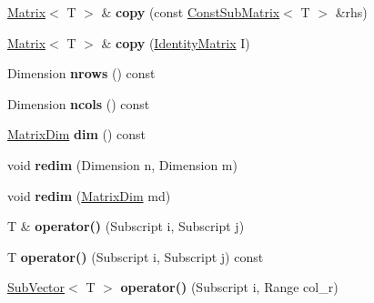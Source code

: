 \begin{DoxyCompactItemize}
\item 
\mbox{\label{classTLAS_1_1Matrix_a58a23834e4f79cbc28a7bef42d16a106}} 
\hyperlink{classTLAS_1_1Matrix}{Matrix}$<$ T $>$ \& {\bfseries copy} (const \hyperlink{classTLAS_1_1ConstSubMatrix}{Const\+Sub\+Matrix}$<$ T $>$ \&rhs)
\item 
\mbox{\label{classTLAS_1_1Matrix_ae0fe442180beb4d2e3a2495e793417c7}} 
\hyperlink{classTLAS_1_1Matrix}{Matrix}$<$ T $>$ \& {\bfseries copy} (\hyperlink{structTLAS_1_1IdentityMatrix}{Identity\+Matrix} I)
\item 
\mbox{\label{classTLAS_1_1Matrix_a99ee860378e9c58d20bda1dd3544e0d0}} 
Dimension {\bfseries nrows} () const
\item 
\mbox{\label{classTLAS_1_1Matrix_ae667fd3dc0fa26a0e3b26859a013523b}} 
Dimension {\bfseries ncols} () const
\item 
\mbox{\label{classTLAS_1_1Matrix_aa6362615018bec56a31038247cb8fe68}} 
\hyperlink{structTLAS_1_1MatrixDim}{Matrix\+Dim} {\bfseries dim} () const
\item 
\mbox{\label{classTLAS_1_1Matrix_adb54e018aa49a048986e3936f447be7c}} 
void {\bfseries redim} (Dimension n, Dimension m)
\item 
\mbox{\label{classTLAS_1_1Matrix_a814ff3302a6f0725ad2fd9142a27af84}} 
void {\bfseries redim} (\hyperlink{structTLAS_1_1MatrixDim}{Matrix\+Dim} md)
\item 
\mbox{\label{classTLAS_1_1Matrix_a121b0c51ec461b1102527510ed1484c6}} 
T \& {\bfseries operator()} (Subscript i, Subscript j)
\item 
\mbox{\label{classTLAS_1_1Matrix_a06b08c4e0cb836953a9826ae04562606}} 
T {\bfseries operator()} (Subscript i, Subscript j) const
\item 
\mbox{\label{classTLAS_1_1Matrix_a0f42850de750b43d23530619fa7310c6}} 
\hyperlink{classTLAS_1_1SubVector}{Sub\+Vector}$<$ T $>$ {\bfseries operator()} (Subscript i, Range col\+\_\+r)

\end{DoxyCompactItemize}
